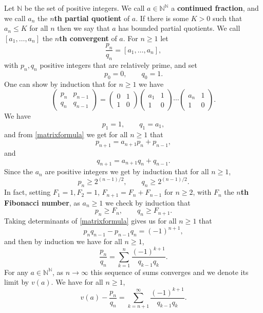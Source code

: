 \documentclass{amsart}
\begin{document}
Let $\mathbb{N}$ be the set of positive integers. We call $a \in \mathbb{N}^\mathbb{N}$ a \textbf{continued fraction}, and we call
$a_n$ the \textbf{$n$th partial quotient} of $a$. If there is some $K>0$ such that $a_n \leq K$ for all $n$ then we say that $a$ has bounded partial quotients.
We call
$[a_1,\ldots,a_n]$ the \textbf{$n$th convergent} of $a$. For $n \geq 1$ let
\[
\frac{p_n}{q_n}=[a_1,\ldots,a_n],
\]
with $p_n,q_n$ positive integers that are relatively prime, and set
\[
p_0=0,\qquad q_0=1.
\]
One can show by induction  \cite[p.~70, Lemma 3.1]{einsiedler} that for $n \geq 1$ we have
\begin{equation}
\begin{pmatrix}p_n&p_{n-1}\\q_n&q_{n-1}\end{pmatrix}=\begin{pmatrix}0&1\\1&0\end{pmatrix}\begin{pmatrix}a_1&1\\1&0\end{pmatrix}
\cdots \begin{pmatrix}a_n&1\\1&0\end{pmatrix}.
\label{matrixformula}
\end{equation}
We have
\[
p_1=1, \qquad q_1=a_1,
\]
 and from \eqref{matrixformula} we get for all $n \geq 1$ that
\[
p_{n+1}=a_{n+1}p_n+p_{n-1},
\]
and
\[
q_{n+1}=a_{n+1}q_n+q_{n-1}.
\]
Since the $a_n$ are positive integers we get by induction that for all $n \geq 1$,
\begin{equation}
p_n \geq 2^{(n-1)/2}, \qquad q_n \geq 2^{(n-1)/2}.
\label{qnbound}
\end{equation}
In fact, setting $F_1=1, F_2=1$, $F_{n+1}=F_n+F_{n-1}$ for $n \geq 2$, with $F_n$ the \textbf{$n$th
Fibonacci number},
as $a_n \geq 1$ we check by induction that
\[
p_n \geq F_n,\qquad q_n \geq F_{n+1}.
\] 
Taking determinants of \eqref{matrixformula} gives us for all $n \geq 1$ that
\begin{equation}
p_nq_{n-1}-p_{n-1}q_n=(-1)^{n+1},
\label{determinants}
\end{equation}
and then by induction we have for all $n \geq 1$,
\[
\frac{p_n}{q_n}=\sum_{k=1}^n \frac{(-1)^{k+1}}{q_{k-1}q_k}.
\]
For any $a \in \mathbb{N}^\mathbb{N}$, as $n \to \infty$ this sequence of sums converges and we denote its limit by $v(a)$.
We have for all $n \geq 1$,
\[
v(a)-\frac{p_n}{q_n}=\sum_{k=n+1}^\infty  \frac{(-1)^{k+1}}{q_{k-1}q_k}.
\]
\end{document}
